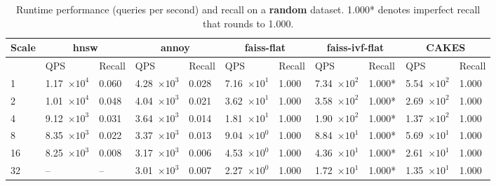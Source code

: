 \begin{table}[!t]
    \caption{Runtime performance (queries per second) and recall on a \textbf{random} dataset. 1.000* denotes imperfect recall that rounds to 1.000.}
    \label{table:results:ann-random}
    \vskip 0.15in
    \begin{center}
        \begin{small}
            \begin{sc}
                \begin{tabular}{|l|p{1.2cm}|p{0.8cm}|p{1.2cm}|p{0.8cm}|p{1.2cm}|p{0.8cm}|p{1.2cm}|p{0.8cm}|p{1.2cm}|p{0.8cm}|}
                    \hline
                    \textbf{Scale}  & \multicolumn{2}{|c|}{\textbf{hnsw}}  & \multicolumn{2}{|c|}{\textbf{annoy}} & \multicolumn{2}{|c|}{\textbf{faiss-flat}} & \multicolumn{2}{|c|}{\textbf{faiss-ivf-flat}}  & \multicolumn{2}{|c|}{\textbf{CAKES}} \\
                    \hline
                    &             QPS & Recall        & QPS & Recall      & QPS & Recall       & QPS & Recall    & QPS & Recall    \\
                    \hline
                    1  & 1.17~$\times10^{4}$ & 0.060 & 4.28~$\times10^{3}$ & 0.028 & 7.16~$\times10^{1}$ & 1.000 & 7.34~$\times10^{2}$ & 1.000* & 5.54~$\times10^{2}$ & 1.000 \\
                    \hline
                    2  & 1.01~$\times10^{4}$ & 0.048 & 4.04~$\times10^{3}$ & 0.021 & 3.62~$\times10^{1}$ & 1.000 & 3.58~$\times10^{2}$ & 1.000* & 2.69~$\times10^{2}$ & 1.000 \\
                    \hline
                    4  & 9.12~$\times10^{3}$ & 0.031 & 3.64~$\times10^{3}$ & 0.014 & 1.81~$\times10^{1}$ & 1.000 & 1.90~$\times10^{2}$ & 1.000* & 1.37~$\times10^{2}$ & 1.000 \\
                    \hline
                    8  & 8.35~$\times10^{3}$ & 0.022 & 3.37~$\times10^{3}$ & 0.013 & 9.04~$\times10^{0}$ & 1.000 & 8.84~$\times10^{1}$ & 1.000* & 5.69~$\times10^{1}$ & 1.000 \\
                    \hline
                    16 & 8.25~$\times10^{3}$ & 0.008 & 3.17~$\times10^{3}$ & 0.006 & 4.53~$\times10^{0}$ & 1.000 & 4.36~$\times10^{1}$ & 1.000* & 2.61~$\times10^{1}$ & 1.000 \\
                    \hline
                    32 & --                  & --    & 3.01~$\times10^{3}$ & 0.007 & 2.27~$\times10^{0}$ & 1.000 & 1.72~$\times10^{1}$ & 1.000* & 1.35~$\times10^{1}$ & 1.000 \\
                    \hline
                \end{tabular}
            \end{sc}
        \end{small}
    \end{center}
    \vskip -0.1in
\end{table}

